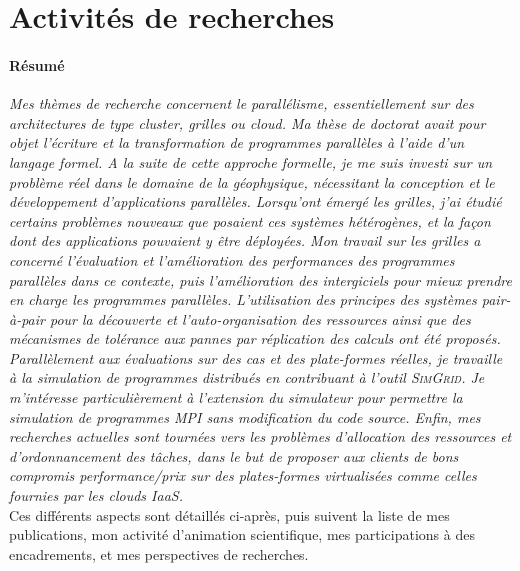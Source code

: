 

\section{Activités de recherches}

\paragraph{Résumé}
\textit{Mes   thèmes    de   recherche   concernent    le   \emph{parallélisme},
  essentiellement  sur  des architectures  de  type  cluster, \emph{grilles}  ou
  \emph{cloud}.  Ma  thèse  de  doctorat  avait  pour  objet  l'écriture  et  la
  transformation de  programmes parallèles  à l'aide d'un  langage formel.  A la
  suite de cette approche formelle, je me suis investi sur un problème réel dans
  le domaine  de la géophysique,  nécessitant la conception et  le développement
  d'applications parallèles. Lorsqu'ont émergé les grilles, j'ai étudié certains
  problèmes nouveaux que posaient ces systèmes hétérogènes, et la façon dont des
  applications  pouvaient  y être  déployées.  Mon  travail  sur les  grilles  a
  concerné  l'évaluation  et  l'amélioration  des  performances  des  programmes
  parallèles dans ce  contexte, puis l'amélioration des  intergiciels pour mieux
  prendre en charge  les programmes parallèles. L'utilisation  des principes des
  systèmes pair-à-pair pour la  découverte et l'auto-organisation des ressources
  ainsi que des  mécanismes de tolérance aux pannes par  réplication des calculs
  ont  été  proposés.   Parallèlement  aux   évaluations  sur  des  cas  et  des
  plate-formes réelles, je travaille à la simulation de programmes distribués en
  contribuant  à l'outil  \textsc{SimGrid}.  Je  m'intéresse particulièrement  à
  l'extension du simulateur pour permettre  la simulation de programmes MPI sans
  modification du  code source.  Enfin,  mes recherches actuelles  sont tournées
  vers les problèmes d'allocation des ressources et d'ordonnancement des tâches,
  dans le but de proposer aux clients de bons compromis performance/prix sur des
  plates-formes virtualisées comme celles fournies par les clouds IaaS.}\\

Ces différents  aspects sont détaillés  ci-après, puis  suivent la liste  de mes
publications, mon  activité d'animation  scientifique, mes participations  à des
encadrements, et mes perspectives de recherches.

